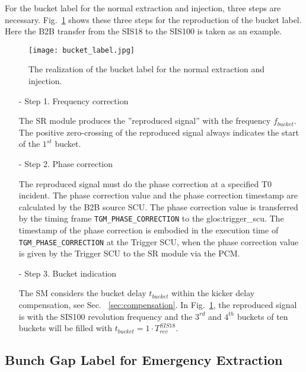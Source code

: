 For the bucket label for the normal extraction and injection, three steps are necessary. Fig.~\ref{bucket_label} shows these three steps for the reproduction of the bucket label. Here the B2B transfer from the SIS18 to the SIS100 is taken as an example.
\begin{figure}[!htb]
   \centering   
   \texttt{[image: bucket\_label.jpg]}
   \caption{The realization of the bucket label for the normal extraction and injection.}
   \label{bucket_label}
\end{figure}  
\begin{itemize}
\item[-] Step 1. Frequency correction

The \gls{SR} module produces the ''reproduced signal'' with the frequency $f_{\mathit{bucket}}$. The positive zero-crossing of the reproduced signal always indicates the start of the $1^{st}$ bucket.
\item[-] Step 2. Phase correction

The reproduced signal must do the phase correction at a specified T0 incident. The phase correction value and the phase correction timestamp are calculated by the B2B source SCU. The phase correction value is transferred by the timing frame \verb|TGM_PHASE_CORRECTION| to the \gls{glos:trigger_scu}. The timestamp of the phase correction is embodied in the execution time of \verb|TGM_PHASE_CORRECTION| at the Trigger SCU, when the phase correction value is given by the Trigger SCU to the SR module via the PCM.


\item[-] Step 3. Bucket indication

The SM considers the bucket delay $t_{\mathit{bucket}}$ within the kicker delay compensation, see Sec. ~\ref{sec:compensation}. In Fig.~\ref{bucket_label}, the reproduced signal is with the SIS100 revolution frequency and the $3^{rd}$ and $4^{th}$ buckets of ten buckets will be filled with $t_{\mathit{bucket}}=1\cdot T_{\mathit{rev}}^{\mathit{SIS18}}$. 
\end{itemize}

\subsection{Bunch Gap Label for Emergency Extraction}

